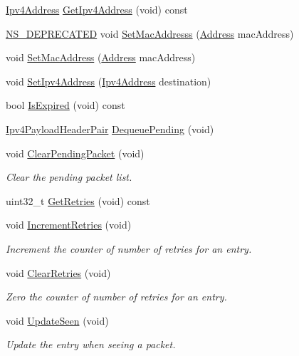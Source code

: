 \begin{DoxyCompactItemize}
\item 
\hyperlink{classns3_1_1Ipv4Address}{Ipv4\+Address} \hyperlink{classns3_1_1ArpCache_1_1Entry_a347046a8c38ac18882ad79927a83ccbd}{Get\+Ipv4\+Address} (void) const 
\item 
\hyperlink{deprecated_8h_a771fbc06c05c32655c757f56492d98c5}{N\+S\+\_\+\+D\+E\+P\+R\+E\+C\+A\+T\+ED} void \hyperlink{classns3_1_1ArpCache_1_1Entry_ae9d1394aee7893efbde4b877e718239c}{Set\+Mac\+Addresss} (\hyperlink{classns3_1_1Address}{Address} mac\+Address)
\item 
void \hyperlink{classns3_1_1ArpCache_1_1Entry_abff7b93331c19b313cb08770f015e1f5}{Set\+Mac\+Address} (\hyperlink{classns3_1_1Address}{Address} mac\+Address)
\item 
void \hyperlink{classns3_1_1ArpCache_1_1Entry_a038ea6ad6f302a71eaf750c17f54a91b}{Set\+Ipv4\+Address} (\hyperlink{classns3_1_1Ipv4Address}{Ipv4\+Address} destination)
\item 
bool \hyperlink{classns3_1_1ArpCache_1_1Entry_ae21ad77ad15e1b8e008f81f8eab30d09}{Is\+Expired} (void) const 
\item 
\hyperlink{classns3_1_1ArpCache_ad018741a53ccc6cdb8b05fdd4873ef3d}{Ipv4\+Payload\+Header\+Pair} \hyperlink{classns3_1_1ArpCache_1_1Entry_a5431ec89b8c362b79f947290824cf4b6}{Dequeue\+Pending} (void)
\item 
void \hyperlink{classns3_1_1ArpCache_1_1Entry_a90371bdf8bf80c585df3cf5607bd8978}{Clear\+Pending\+Packet} (void)
\begin{DoxyCompactList}\small\item\em Clear the pending packet list. \end{DoxyCompactList}\item 
uint32\+\_\+t \hyperlink{classns3_1_1ArpCache_1_1Entry_a9ca6a8d9f18d70300a2ffe44f5f25840}{Get\+Retries} (void) const 
\item 
void \hyperlink{classns3_1_1ArpCache_1_1Entry_aa908b07bd10145d161377099e19abefb}{Increment\+Retries} (void)
\begin{DoxyCompactList}\small\item\em Increment the counter of number of retries for an entry. \end{DoxyCompactList}\item 
void \hyperlink{classns3_1_1ArpCache_1_1Entry_a1482ad5c26ca8a47a754c36c9d12457a}{Clear\+Retries} (void)
\begin{DoxyCompactList}\small\item\em Zero the counter of number of retries for an entry. \end{DoxyCompactList}\item 
void \hyperlink{classns3_1_1ArpCache_1_1Entry_ace80d88fc28b4defd82ddb8ad7d5ad07}{Update\+Seen} (void)
\begin{DoxyCompactList}\small\item\em Update the entry when seeing a packet. \end{DoxyCompactList}\end{DoxyCompactItemize}
